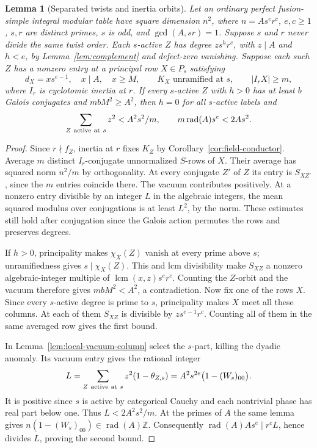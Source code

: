 \documentclass[11pt,a4paper]{article}
\numberwithin{equation}{section}
\newtheorem{lemma}[theorem]{Lemma}
\theoremstyle{remark}
\begin{document}
\begin{lemma}[Separated twists and inertia orbits]\label{u2:separation}
Let an ordinary perfect fusion-simple integral modular table have square
dimension $n^2$, where $n=A s^e r^c$, $e,c\ge1$, $s,r$ are distinct
primes, $s$ is odd, and $\gcd(A,sr)=1$. Suppose $s$ and $r$ never
divide the same twist order. Each $s$-active $Z$ has degree
$z s^h r^c$, with $z\mid A$ and $h<e$, by Lemma~\ref{lem:complement}
and defect-zero vanishing. Suppose each such $Z$ has a nonzero entry
at a principal row $X\in P_s$ satisfying
\[
 d_X=x s^{e-1},\quad x\mid A,\quad x\ge M,\qquad
 K_X\text{ unramified at }s,\qquad |I_r X|\ge m,
\]
where $I_r$ is cyclotomic inertia at $r$. If every $s$-active $Z$ with
$h>0$ has at least $b$ Galois conjugates and $mbM^2\ge A^2$, then
$h=0$ for all $s$-active labels and
\[
 \sum_{Z\ {\rm active\ at}\ s} z^2 < A^2s^2/m,\qquad
 m\operatorname{rad}(A)s^e < 2As^2 .
\]
\end{lemma}
\begin{proof}
Since $r\nmid f_Z$, inertia at $r$ fixes $K_Z$ by
Corollary~\ref{cor:field-conductor}. Average $m$ distinct $I_r$-conjugate
unnormalized $S$-rows of $X$. Their average has squared norm $n^2/m$
by orthogonality. At every conjugate $Z'$ of $Z$ its entry is
$S_{XZ'}$, since the $m$ entries coincide there.
The vacuum contributes positively. At a nonzero entry divisible by
an integer $L$ in the algebraic integers, the mean squared modulus
over conjugations is at least $L^2$, by the norm.
These estimates still hold after conjugation since the Galois action
permutes the rows and preserves degrees.

If $h>0$, principality makes $\chi_X(Z)$ vanish at every prime above
$s$; unramifiedness gives $s\mid\chi_X(Z)$. This and lcm divisibility
make $S_{XZ}$ a nonzero algebraic-integer multiple of
$\operatorname{lcm}(x,z)s^e r^c$. Counting the $Z$-orbit and the
vacuum therefore gives $mbM^2<A^2$, a contradiction.
Now fix one of the rows $X$. Since every $s$-active degree is
prime to $s$, principality makes $X$ meet all these columns.
At each of them $S_{XZ}$ is divisible by $z s^{e-1}r^c$.
Counting all of them in the same averaged row gives the first bound.

In Lemma~\ref{lem:local-vacuum-column} select the $s$-part, killing
the dyadic anomaly. Its vacuum entry gives the rational integer
\[
 L=\sum_{Z\ {\rm active\ at}\ s}z^2(1-\theta_{Z,s})
   =A^2s^{2e}\bigl(1-(W_s)_{00}\bigr).
\]
It is positive since $s$ is active by categorical Cauchy and each
nontrivial phase has real part below one. Thus $L<2A^2s^2/m$.
At the primes of $A$ the same lemma gives
$n(1-(W_s)_{00})\in\operatorname{rad}(A)\mathbb Z$.
Consequently $\operatorname{rad}(A)As^e\mid r^c L$, hence divides
$L$, proving the second bound.
\end{proof}
\end{document}
